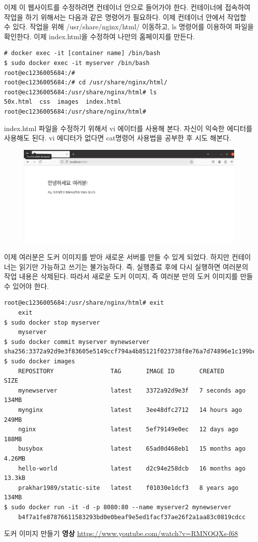 이제 이 웹사이트를 수정하려면 컨테이너 안으로 들어가야 한다. 컨테이너에 접속하여 작업을 하기 위해서는 다음과 같은 명령어가 필요하다. 이제 컨테이너 안에서 작업할 수 있다. 작업을 위해 /usr/share/nginx/html/ 이동하고, ls 명령어를 이용하여 파일을 확인한다. 이제 index.html을 수정하여 나만의 홈페이지를 만든다. 
\begin{lstlisting}[language=Shell]
# docker exec -it [container name] /bin/bash
$ sudo docker exec -it myserver /bin/bash
root@ec1236005684:/# 
root@ec1236005684:/# cd /usr/share/nginx/html/
root@ec1236005684:/usr/share/nginx/html# ls
50x.html  css  images  index.html
root@ec1236005684:/usr/share/nginx/html# 
\end{lstlisting}

index.html 파일을 수정하기 위해서 vi 에이터를 사용해 본다. 자신이 익숙한 에디터를 사용해도 된다. vi 에디터가 없다면 cat명령어 사용법을 공부한 후 시도 해본다. 

\begin{figure}[htp]
    \centering
    \includegraphics[width=\textwidth]{images/chaptert5images/image.png}
\end{figure}

이제 여러분은 도커 이미지를 받아 새로운 서버를 만들 수 있게 되었다. 하지만 컨테이너는 읽기만 가능하고 쓰기는 불가능하다. 즉, 실행종료 후에 다시 실행하면 여러분의 작업 내용은 삭제된다. 따라서 새로운 도커 이미지, 즉 여러분 만의 도커 이미지를 만들 수 있어야 한다. 

\begin{lstlisting}[language=Shell]
root@ec1236005684:/usr/share/nginx/html# exit
    exit
$ sudo docker stop myserver 
    myserver
$ sudo docker commit myserver mynewserver
sha256:3372a92d9e3f83605e5149ccf794a4b85121f023738f8e76a7d74896e1c199bc
$ sudo docker images
    REPOSITORY                TAG       IMAGE ID       CREATED         SIZE
    mynewserver               latest    3372a92d9e3f   7 seconds ago   134MB
    mynginx                   latest    3ee48dfc2712   14 hours ago    249MB
    nginx                     latest    5ef79149e0ec   12 days ago     188MB
    busybox                   latest    65ad0d468eb1   15 months ago   4.26MB
    hello-world               latest    d2c94e258dcb   16 months ago   13.3kB
    prakhar1989/static-site   latest    f01030e1dcf3   8 years ago     134MB
$ sudo docker run -it -d -p 8080:80 --name myserver2 mynewserver
    b4f7a1fe87876611583293bd0e0beaf9e5ed1facf37ae26f2a1aa83c0819cdcc
\end{lstlisting}

\begin{KnowledgeBox}{도커 이미지 만들기}
    \textbf{영상}
\url{https://www.youtube.com/watch?v=RMNOQXs-f68}
\end{KnowledgeBox}